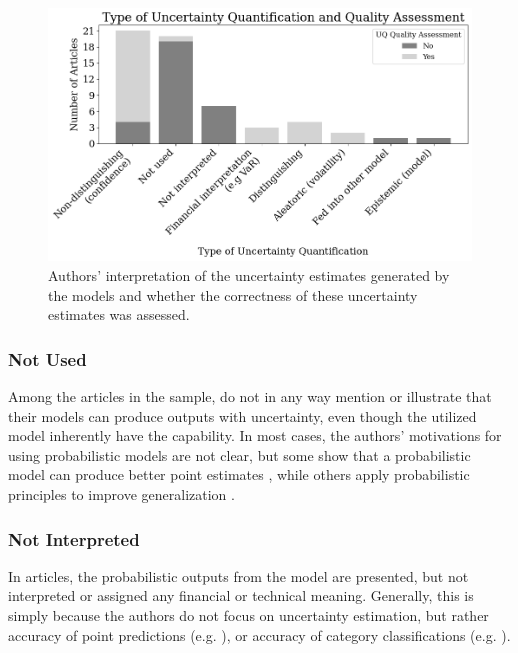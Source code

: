 \begin{figure}[H]
    \centering
    \includegraphics[width=1\linewidth]{Images/uncertainty_quantification_by_type_and_assessment.png}
    \caption[Breakdown of authors’ interpretation and quality assessment of uncertainty estimates]{Authors' interpretation of the uncertainty estimates generated by the models and whether the correctness of these uncertainty estimates was assessed.}
    \label{fig:uncertainty_quantification_by_type_and_assessment}
\end{figure}


\subsubsection{Not Used}

Among the \samplesize articles in the sample, \uqnotused do not in any way mention or illustrate that their models can produce outputs with uncertainty, even though the utilized model inherently have the capability. In most cases, the authors' motivations for using probabilistic models are not clear, but some show that a probabilistic model can produce better point estimates \parencite{Daniali2021, Papaioannou2022gpr, Park2014gpr}, while others apply probabilistic principles to improve generalization \parencite{jang2018generative}.

\subsubsection{Not Interpreted}

In \uqnotinterpreted articles, the probabilistic outputs from the model are presented, but not interpreted or assigned any financial or technical meaning. Generally, this is simply because the authors do not focus on uncertainty estimation, but rather accuracy of point predictions (e.g. \cite{DeSpiegeleer2018gpr}), or accuracy of category classifications (e.g. \cite{Malagrino2018Forecasting, Zhang2016}).


